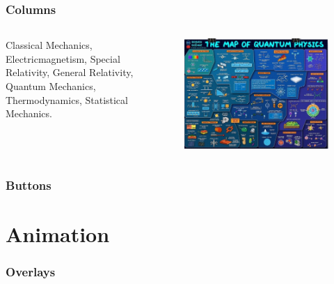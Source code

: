 \documentclass{beamer}
\begin{document}
\begin{frame}
	\frametitle{Columns}
	\begin{columns}
		Classical Mechanics, Electricmagnetism, Special Relativity, General Relativity, Quantum Mechanics, Thermodynamics, Statistical Mechanics.
		
		\begin{figure}
			\centering
			\includegraphics[width=\columnwidth]{./data/MapQM.jpg}
		\end{figure}
		
	\end{columns}

\end{frame}


\begin{frame}
	\frametitle{Buttons}
	\hyperlink{contents}{}	
	\hyperlink{contents}{}
	\hyperlink{contents}{}
	\hyperlink{contents}{}
\end{frame}



\section{Animation}


\begin{frame}
	\frametitle{Overlays}
	
	
\end{frame}
\end{document}
